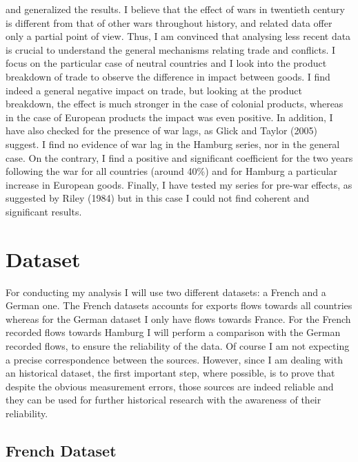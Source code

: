 \documentclass[12pt,a4paper,titlepage,english]{article}
\begin{document}
and generalized the results. I believe that the effect of wars in twentieth century is different from that of other wars throughout history, and related data offer only a partial point of view. Thus, I am convinced that analysing less recent data is crucial to understand the general mechanisms relating trade and conflicts. I focus on the particular case of neutral countries and I look into the product breakdown of trade to observe the difference in impact between goods. I find indeed a general negative impact on trade, but looking at the product breakdown, the effect is much stronger in the case of colonial products, whereas in the case of European products the impact was even positive. In addition, I have also checked for the presence of war lags, as Glick and Taylor (2005) suggest. I find no evidence of war lag in the Hamburg series, nor in the general case. On the contrary, I find a positive and significant coefficient for the two years following the war for all countries (around 40\%) and for Hamburg a particular increase in European goods. Finally, I have tested my series for pre-war effects, as suggested by Riley (1984) but in this case I could not find coherent and significant results.


\section{Dataset}
For conducting my analysis I will use two different datasets: a French and a German one. The French datasets accounts for exports flows towards all countries whereas for the German dataset I only have flows towards France. For the French recorded flows towards Hamburg I will perform a comparison with the German recorded flows, to ensure the reliability of the data. Of course I am not expecting a precise correspondence between the sources. However, since I am dealing with an historical dataset, the first important step, where possible, is to prove that despite the obvious measurement errors, those sources are indeed reliable and they can be used for further historical research with the awareness of their reliability. 

\subsection{French Dataset}
\end{document}
